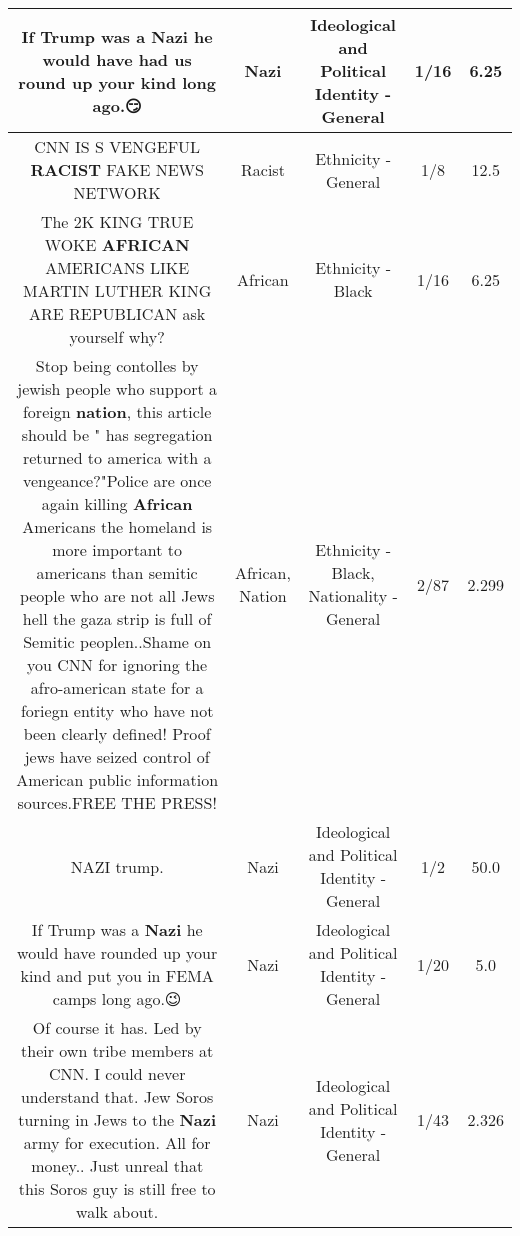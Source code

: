 \documentclass[11pt]{article}
\newlength\mylength
\begin{document}
\begin{center}
\begin{longtable}{|C{.65\mylength}|C{.30\mylength}|C{.12\mylength}|C{.12\mylength}|C{.12\mylength}|}
  \small If Trump was a \textbf{Nazi} he would have had us round up your kind long ago.😏\normalsize   & Nazi &  Ideological and Political Identity - General & 1/16 & 6.25 \\  \hline
  \small CNN IS S VENGEFUL \textbf{RACIST} FAKE NEWS NETWORK\normalsize   & Racist & Ethnicity - General & 1/8 & 12.5 \\  \hline
  \small The 2K KING TRUE WOKE \textbf{AFRICAN} AMERICANS LIKE MARTIN LUTHER KING ARE REPUBLICAN ask yourself why?\normalsize   & African & Ethnicity - Black & 1/16 & 6.25 \\  \hline
  \small Stop being contolles by jewish people who support a foreign \textbf{nation}, this article should be " has segregation returned to america with a vengeance?"Police are once again killing \textbf{African} Americans the homeland is more important to americans than semitic people who are not all Jews hell the gaza strip is full of Semitic peoplen..Shame on you CNN for ignoring the afro-american state for a foriegn entity who have not been clearly defined! Proof jews have seized control of American public information sources.FREE THE PRESS!\normalsize   & African, Nation & Ethnicity - Black, Nationality - General & 2/87 & 2.299 \\  \hline
  \small NAZI trump.\normalsize   & Nazi &  Ideological and Political Identity - General & 1/2 & 50.0 \\  \hline
  \small If Trump was a \textbf{Nazi} he would have rounded up your kind and put you in FEMA camps long ago.😉\normalsize   & Nazi &  Ideological and Political Identity - General & 1/20 & 5.0 \\  \hline
  \small Of course it has. Led by their own tribe members at CNN.  I could never understand that. Jew Soros turning in Jews to the \textbf{Nazi}  army for execution.  All for money..  Just unreal that this Soros guy is still free to walk about.\normalsize   & Nazi &  Ideological and Political Identity - General & 1/43 & 2.326 \\  \hline

\end{longtable}
\end{center}
\end{document}
